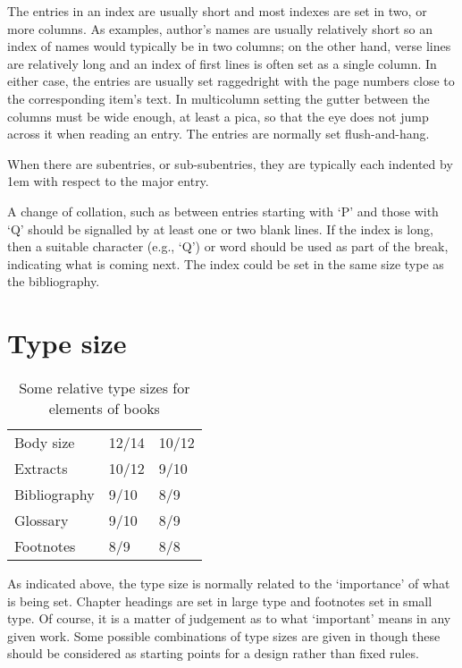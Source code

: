 \documentclass[10pt,a4paper,extrafontsizes]{memoir}
\begin{document}
\begin{paracol}{2}
\switchEng
    The entries in an index are usually short and most indexes
are set in two, or more columns. As examples, author's names are usually 
relatively short so an index of names would typically be in two columns;
on the other hand, verse lines are relatively long and an index of first lines
is often set as a single column. In either case, the entries are usually set 
raggedright with the page numbers close to the corresponding item's text.
In multicolumn setting the gutter between the columns must be wide enough,
at least a pica, so
that the eye does not jump across it when reading an entry. The entries are
normally set flush-and-hang.

    When there are subentries, or sub-subentries, they are typically
each indented by 1em with respect to the major entry.

   A change of collation, such as between entries starting with `P' and those
with `Q' should be signalled by at least one or two blank lines. If the index
is long, then a suitable character (e.g., `Q') or word should be used as 
part of the break, indicating what is coming next. The index could be set
in the same size type as the bibliography.
\end{paracol}

\section{Type size}

\begin{table}
\centering
\caption{Some relative type sizes for elements of books}\label{tab:reltypesizing}
\begin{tabular}{lll} \toprule
Body size & 12/14  & 10/12 \\
Extracts  & 10/12 &  9/10 \\
Bibliography & 9/10 & 8/9 \\
Glossary     & 9/10 & 8/9 \\
Footnotes   & 8/9 & 8/8 \\
\bottomrule
\end{tabular}
\end{table}

\begin{paracol}{2}
\switchEng
    As indicated above, the type size is normally related to the `importance' 
of what is being set. Chapter headings are set in large type and footnotes 
set in small type. Of course, it is a matter of judgement as to what 
`important' means in any given work. Some possible combinations of type sizes
are given in  though these should be considered as
starting points for a design rather than fixed rules.
\end{paracol}
\end{document}
